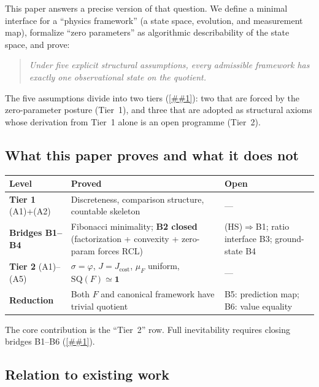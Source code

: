 \documentclass[11pt]{article}
\providecommand{\cref}[1]{\ref{##1}}%
\newcommand{\Jcost}{J_{\mathrm{cost}}}
\newcommand{\SQ}{\mathrm{SQ}}
\theoremstyle{definition}
\theoremstyle{remark}
\begin{document}
This paper answers a precise version of that question.
We define a minimal interface for a ``physics framework''
(a state space, evolution, and measurement map),
formalize ``zero parameters'' as algorithmic describability
of the state space,
and prove:

\begin{quote}
\emph{Under five explicit structural assumptions, every admissible
framework has exactly one observational state on the quotient.}
\end{quote}

\noindent
The five assumptions divide into two tiers (\cref{sec:assumptions}):
two that are forced by the zero-parameter posture (Tier~1),
and three that are adopted as structural axioms whose derivation
from Tier~1 alone is an open programme (Tier~2).

\subsection{What this paper proves and what it does not}

\begin{center}
\renewcommand{\arraystretch}{1.2}
\begin{tabular}{|p{3.5cm}|p{4.5cm}|p{4.5cm}|}
\hline
\textbf{Level} & \textbf{Proved} & \textbf{Open} \\
\hline
\textbf{Tier 1} (A1)+(A2) &
  Discreteness, comparison structure, countable skeleton &
  --- \\
\hline
\textbf{Bridges B1--B4} &
  Fibonacci minimality; \textbf{B2 closed}
  (factorization + convexity + zero-param forces RCL) &
  (HS)$\Rightarrow$B1;
  ratio interface B3; ground-state B4 \\
\hline
\textbf{Tier 2} (A1)--(A5) &
  $\sigma = \varphi$,\; $J = \Jcost$,\;
  $\mu_F$ uniform,\; $\SQ(F) \simeq \mathbf{1}$ &
  --- \\
\hline
\textbf{Reduction} &
  Both $F$ and canonical framework have trivial quotient &
  B5: prediction map;\; B6: value equality \\
\hline
\end{tabular}
\end{center}

\medskip\noindent
The core contribution is the ``Tier~2'' row.
Full inevitability requires closing bridges B1--B6
(\cref{sec:bridges}).

\subsection{Relation to existing work}
\end{document}
